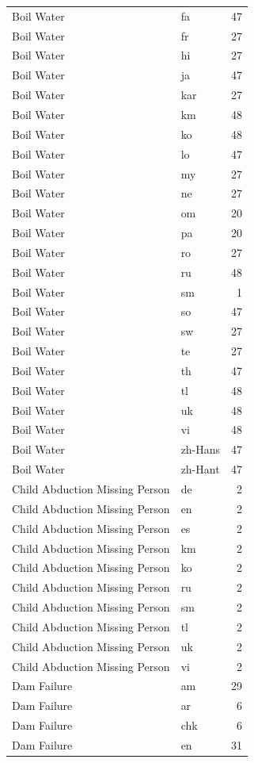 \begin{longtable}{p{3cm} p{3cm} r}
Boil Water & fa & 47 \\
Boil Water & fr & 27 \\
Boil Water & hi & 27 \\
Boil Water & ja & 47 \\
Boil Water & kar & 27 \\
Boil Water & km & 48 \\
Boil Water & ko & 48 \\
Boil Water & lo & 47 \\
Boil Water & my & 27 \\
Boil Water & ne & 27 \\
Boil Water & om & 20 \\
Boil Water & pa & 20 \\
Boil Water & ro & 27 \\
Boil Water & ru & 48 \\
Boil Water & sm & 1 \\
Boil Water & so & 47 \\
Boil Water & sw & 27 \\
Boil Water & te & 27 \\
Boil Water & th & 47 \\
Boil Water & tl & 48 \\
Boil Water & uk & 48 \\
Boil Water & vi & 48 \\
Boil Water & zh-Hans & 47 \\
Boil Water & zh-Hant & 47 \\
Child Abduction Missing Person & de & 2 \\
Child Abduction Missing Person & en & 2 \\
Child Abduction Missing Person & es & 2 \\
Child Abduction Missing Person & km & 2 \\
Child Abduction Missing Person & ko & 2 \\
Child Abduction Missing Person & ru & 2 \\
Child Abduction Missing Person & sm & 2 \\
Child Abduction Missing Person & tl & 2 \\
Child Abduction Missing Person & uk & 2 \\
Child Abduction Missing Person & vi & 2 \\
Dam Failure & am & 29 \\
Dam Failure & ar & 6 \\
Dam Failure & chk & 6 \\
Dam Failure & en & 31 \\

\end{longtable}
